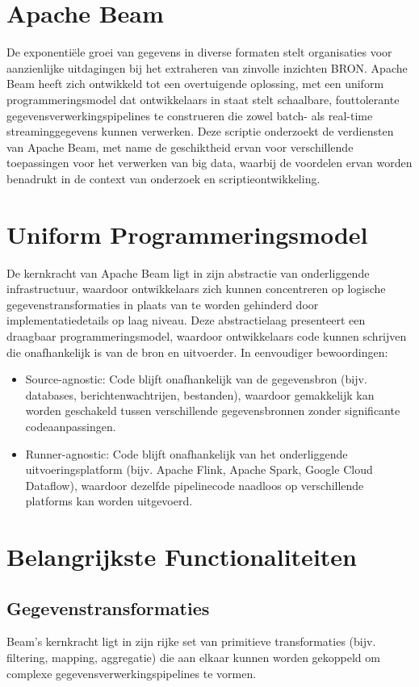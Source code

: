 \section{Apache Beam}

De exponentiële groei van gegevens in diverse formaten stelt organisaties voor aanzienlijke uitdagingen bij het extraheren van zinvolle inzichten {BRON}. Apache Beam heeft zich ontwikkeld tot een overtuigende oplossing, met een uniform programmeringsmodel dat ontwikkelaars in staat stelt schaalbare, fouttolerante gegevensverwerkingspipelines te construeren die zowel batch- als real-time streaminggegevens kunnen verwerken. Deze scriptie onderzoekt de verdiensten van Apache Beam, met name de geschiktheid ervan voor verschillende toepassingen voor het verwerken van big data, waarbij de voordelen ervan worden benadrukt in de context van onderzoek en scriptieontwikkeling.

\section{Uniform Programmeringsmodel}

De kernkracht van Apache Beam ligt in zijn abstractie van onderliggende infrastructuur, waardoor ontwikkelaars zich kunnen concentreren op logische gegevenstransformaties in plaats van te worden gehinderd door implementatiedetails op laag niveau. Deze abstractielaag presenteert een draagbaar programmeringsmodel, waardoor ontwikkelaars code kunnen schrijven die onafhankelijk is van de bron en uitvoerder. In eenvoudiger bewoordingen:
\begin{itemize}
    \item Source-agnostic: Code blijft onafhankelijk van de gegevensbron (bijv. databases, berichtenwachtrijen, bestanden), waardoor gemakkelijk kan worden geschakeld tussen verschillende gegevensbronnen zonder significante codeaanpassingen.
    \item Runner-agnostic: Code blijft onafhankelijk van het onderliggende uitvoeringsplatform (bijv. Apache Flink, Apache Spark, Google Cloud Dataflow), waardoor dezelfde pipelinecode naadloos op verschillende platforms kan worden uitgevoerd.
\end{itemize}

\section{Belangrijkste Functionaliteiten}

\subsection{Gegevenstransformaties}
Beam's kernkracht ligt in zijn rijke set van primitieve transformaties (bijv. filtering, mapping, aggregatie) die aan elkaar kunnen worden gekoppeld om complexe gegevensverwerkingspipelines te vormen.

